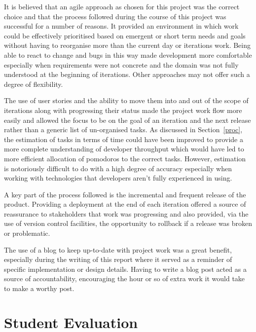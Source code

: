 It is believed that an agile approach as chosen for this project was the correct choice and that the process followed during the course of this project was successful for a number of reasons. It provided an environment in which work could be effectively prioritised based on emergent or short term needs and goals without having to reorganise more than the current day or iterations work. Being able to react to change and bugs in this way made development more comfortable especially when requirements were not concrete and the domain was not fully understood at the beginning of iterations. Other approaches may not offer such a degree of flexibility.

The use of user stories and the ability to move them into and out of the scope of iterations along with progressing their status made the project work flow more easily and allowed the focus to be on the goal of an iteration and the next release rather than a generic list of un-organised tasks.  As discussed in Section~\ref{proc}, the estimation of tasks in terms of time could have been improved to provide a more complete understanding of developer throughput which would have led to more efficient allocation of pomodoros to the correct tasks. However, estimation is notoriously difficult to do with a high degree of accuracy especially when working with technologies that developers aren't fully experienced in using.

A key part of the process followed is the incremental and frequent release of the product. Providing a deployment at the end of each iteration offered a source of reassurance to stakeholders that work was progressing and also provided, via the use of version control facilities, the opportunity to rollback if a release was broken or problematic.

The use of a blog to keep up-to-date with project work was a great benefit, especially during the writing of this report where it served as a reminder of specific implementation or design details. Having to write a blog post acted as a source of accountability, encouraging the hour or so of extra work it would take to make a worthy post.

\section{Student Evaluation}

